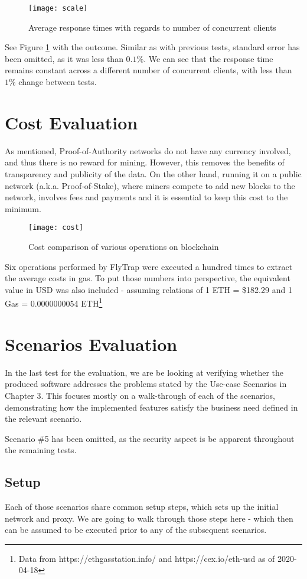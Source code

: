 \begin{figure}[h]
    \centering
    \texttt{[image: scale]}
    \caption{Average response times with regards to number of concurrent clients}
    \label{fig:scale}
\end{figure}
See Figure \ref{fig:scale} with the outcome. Similar as with previous tests, standard error has been omitted, as it was less than $0.1\%$. We can see that the response time remains constant across a different number of concurrent clients, with less than $1\%$ change between tests.

\section{Cost Evaluation}
As mentioned, Proof-of-Authority networks do not have any currency involved, and thus there is no reward for mining. However, this removes the benefits of transparency and publicity of the data. On the other hand, running it on a public network (a.k.a. Proof-of-Stake), where miners compete to add new blocks to the network, involves fees and payments and it is essential to keep this cost to the minimum.

\begin{figure}[h]
    \centering
    \texttt{[image: cost]}
    \caption{Cost comparison of various operations on blockchain}
    \label{fig:cost}
\end{figure}

Six operations performed by FlyTrap were executed a hundred times to extract the average costs in gas. To put those numbers into perspective, the equivalent value in USD was also included - assuming relations of 1 ETH = \$182.29 and 1 Gas = 0.0000000054 ETH\footnote{Data from https://ethgasstation.info/ and https://cex.io/eth-usd as of 2020-04-18}


\section{Scenarios Evaluation}
In the last test for the evaluation, we are be looking at verifying whether the produced software addresses the problems stated by the Use-case Scenarios in Chapter 3. This focuses mostly on a walk-through of each of the scenarios, demonstrating how the implemented features satisfy the business need defined in the relevant scenario.

Scenario \#5 has been omitted, as the security aspect is be apparent throughout the remaining tests.
\subsection{Setup}
Each of those scenarios share common setup steps, which sets up the initial network and proxy. We are going to walk through those steps here - which then can be assumed to be executed prior to any of the subsequent scenarios.
